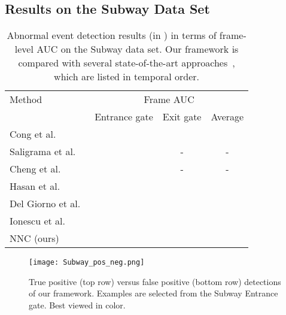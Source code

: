 \documentclass[10pt,twocolumn,letterpaper]{article}
\begin{document}
\vspace*{-0.1cm}
\subsection{Results on the Subway Data Set}
\vspace*{-0.1cm}

\begin{table}[t]
\small{
\begin{center}
\begin{tabular}{|l|c|c|c|}
\hline
Method 																& \multicolumn{3}{|c|}{Frame AUC} \\
\cline{2-4}
			 																& Entrance gate  	& Exit gate 	& Average\\
\hline
\hline
Cong et al.~\cite{Cong-CVPR-2011}						& 				&  		& \\
Saligrama et al.~\cite{Saligrama-CVPR-2012}		& 	 			& - 				& -\\
Cheng et al.~\cite{Cheng-CVPR-2015}					&  				& - 				& -\\
Hasan et al.~\cite{Hasan-CVPR-2016}					& 				& 	 	& \\
Del Giorno et al.~\cite{Giorno-ECCV-2016}			& 				&  		& \\
Ionescu et al.~\cite{Ionescu-ICCV-2017}				& 				&  		& \\
\hline
NNC (ours)															& 				&  		& \\
\hline
\end{tabular}
\end{center}
\vspace*{-0.1cm}
\caption{Abnormal event detection results (in ) in terms of frame-level AUC on the Subway data set. Our framework is compared with several state-of-the-art approaches~\cite{Cheng-CVPR-2015,Cong-CVPR-2011,Giorno-ECCV-2016,Hasan-CVPR-2016,Ionescu-ICCV-2017,Saligrama-CVPR-2012}, which are listed in temporal order.\label{tab_Subway}}
}
\vspace*{-0.1cm}
\end{table}

\begin{figure}[!t]
\begin{center}
\texttt{[image: Subway\_pos\_neg.png]}
\end{center}
\vspace*{-0.3cm}
\caption{True positive (top row) versus false positive (bottom row) detections of our framework. Examples are selected from the Subway Entrance gate. Best viewed in color.}
\label{fig_Subway_pos_neg}
\vspace*{-0.4cm}
\end{figure}
\end{document}
